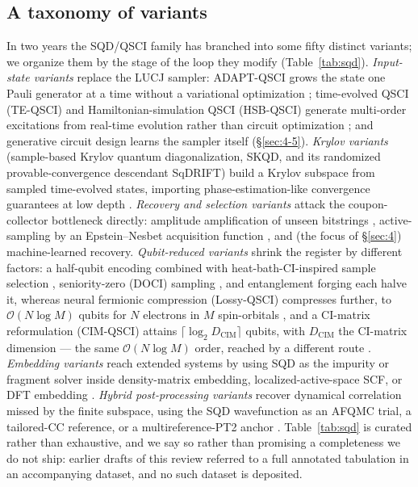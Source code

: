 \documentclass[onecolumn,a4paper]{quantumarticle}
\begin{document}
\subsection{A taxonomy of variants}\label{sec:2-2}

In two years the SQD/QSCI family has branched into some fifty distinct variants; we organize them by the stage of the loop they modify (Table~\ref{tab:sqd}). \emph{Input-state variants} replace the LUCJ sampler: ADAPT-QSCI grows the state one Pauli generator at a time without a variational optimization \cite{nakagawa2024}; time-evolved QSCI (TE-QSCI) and Hamiltonian-simulation QSCI (HSB-QSCI) generate multi-order excitations from real-time evolution rather than circuit optimization \cite{mikkelsen2025,sugisaki2025}; and generative circuit design learns the sampler itself (\S\ref{sec:4-5}). \emph{Krylov variants} (sample-based Krylov quantum diagonalization, SKQD, and its randomized provable-convergence descendant SqDRIFT) build a Krylov subspace from sampled time-evolved states, importing phase-estimation-like convergence guarantees at low depth \cite{yu2025,piccinelli2025}. \emph{Recovery and selection variants} attack the coupon-collector bottleneck directly: amplitude amplification of unseen bitstrings \cite{stockinger2026}, active-sampling by an Epstein--Nesbet acquisition function \cite{miura2026}, and (the focus of \S\ref{sec:4}) machine-learned recovery. \emph{Qubit-reduced variants} shrink the register by different factors: a half-qubit encoding combined with heat-bath-CI-inspired sample selection \cite{mcfarthing2026}, seniority-zero (DOCI) sampling \cite{yoshida2026}, and entanglement forging \cite{smith2025} each halve it, whereas neural fermionic compression (Lossy-QSCI) compresses further, to $\mathcal{O}(N\log M)$ qubits for $N$ electrons in $M$ spin-orbitals \cite{chen2025}, and a CI-matrix reformulation (CIM-QSCI) attains $\lceil \log_2 D_{\mathrm{CIM}} \rceil$ qubits, with $D_{\mathrm{CIM}}$ the CI-matrix dimension --- the same $\mathcal{O}(N \log M)$ order, reached by a different route \cite{graves2026}. \emph{Embedding variants} reach extended systems by using SQD as the impurity or fragment solver inside density-matrix embedding, localized-active-space SCF, or DFT embedding \cite{shajan2025,wang2026}. \emph{Hybrid post-processing variants} recover dynamical correlation missed by the finite subspace, using the SQD wavefunction as an AFQMC trial, a tailored-CC reference, or a multireference-PT2 anchor \cite{danilov2025,erhart2025}. Table~\ref{tab:sqd} is curated rather than exhaustive, and we say so rather than promising a completeness we do not ship: earlier drafts of this review referred to a full annotated tabulation in an accompanying dataset, and no such dataset is deposited.
\end{document}
